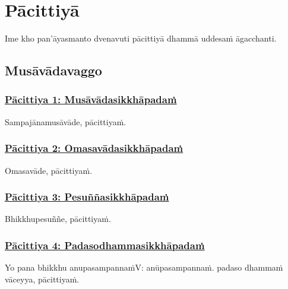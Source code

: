 
\section{Pācittiyā}
\label{pc}

\begin{intro}
	Ime kho pan'āyasmanto dvenavuti pācittiyā dhammā uddesaṁ āgacchanti.
\end{intro}

\subsection{Musāvādavaggo}

\subsubsection*{\hyperref[exp1]{Pācittiya 1: Musāvādasikkhāpadaṁ}}
\label{pac1}

Sampajānamusāvāde, pācittiyaṁ.



\subsubsection*{\hyperref[exp2]{Pācittiya 2: Omasavādasikkhāpadaṁ}}
\label{pac2}

Omasavāde, pācittiyaṁ.



\subsubsection*{\hyperref[exp3]{Pācittiya 3: Pesuññasikkhāpadaṁ}}
\label{pac3}

Bhikkhupesuññe, pācittiyaṁ.



\subsubsection*{\hyperref[exp4]{Pācittiya 4: Padasodhammasikkhāpadaṁ}}
\label{pac4}

Yo pana bhikkhu anupasampannaṁ\makeatletter\hyperlink{endnote-appendix}\makeatother V: anūpasampannaṁ. padaso dhammaṁ vāceyya, pācittiyaṁ.



